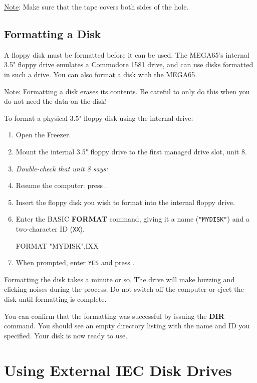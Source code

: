 \underline{Note}: Make sure that the tape covers both sides of the hole.

\subsection{Formatting a Disk}

A floppy disk must be formatted before it can be used. The MEGA65's internal 3.5" floppy drive emulates a Commodore 1581 drive, and can use disks formatted in such a drive. You can also format a disk with the MEGA65.

\underline{Note}: Formatting a disk erases its contents. Be careful to only do this when you do not need the data on the disk!

To format a physical 3.5" floppy disk using the internal drive:

\begin{enumerate}
\item Open the Freezer.
\item Mount the internal 3.5" floppy drive to the first managed drive slot, unit 8.
\item {\it Double-check that unit 8 says:} 
\item Resume the computer: press .
\item Insert the floppy disk you wish to format into the internal floppy drive.
\item Enter the BASIC {\bf FORMAT} command, giving it a name ({\tt "MYDISK"}) and a two-character ID ({\tt XX}).
\begin{screenoutput}
FORMAT "MYDISK",IXX
\end{screenoutput}
\item When prompted, enter {\tt YES} and press .
\end{enumerate}

Formatting the disk takes a minute or so. The drive will make buzzing and clicking noises during the process. Do not switch off the computer or eject the disk until formatting is complete.

You can confirm that the formatting was successful by issuing the {\bf DIR} command. You should see an empty directory listing with the name and ID you specified. Your disk is now ready to use.


\section{Using External IEC Disk Drives}

